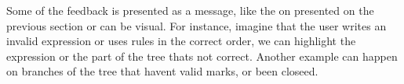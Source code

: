 Some of the feedback is presented as a message, like the on presented on the previous section or can be visual. For instance, imagine that the user writes an invalid expression or uses rules in the correct order, we can highlight the expression or the part of the tree thats not correct. Another example can happen on branches of the tree that havent valid marks, or been closeed.